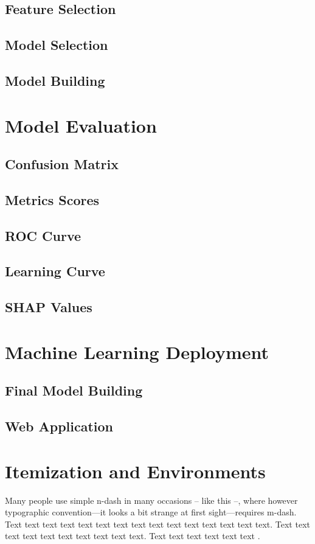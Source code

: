 \subsection{Feature Selection}
\subsection{Model Selection}
\subsection{Model Building}
\section{Model Evaluation}
\subsection{Confusion Matrix}
\subsection{Metrics Scores}
\subsection{ROC Curve}
\subsection{Learning Curve}
\subsection{SHAP Values}
\section{Machine Learning Deployment}
\subsection{Final Model Building}
\subsection{Web Application}

\section{Itemization and Environments}

Many people use simple n-dash in many occasions -- like this --, where however typographic convention---it looks a bit strange at first sight---requires m-dash. Text text text text text text text text text text text text text text text. Text text text text text text text text text text. Text text text text text text \citet{Haufler2006}. 

